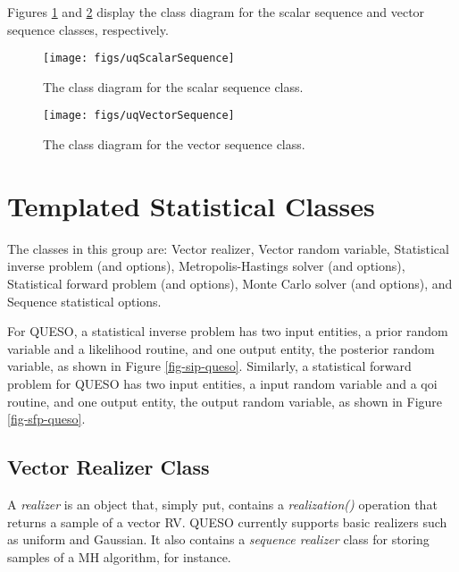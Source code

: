 Figures \ref{fig-scalar-sequence-class} and \ref{fig-vector-sequence-class} display the class diagram for the scalar sequence  and vector sequence classes, respectively.

\begin{figure}[h!]
\centering
\texttt{[image: figs/uqScalarSequence]}
\vspace{-8pt}
\caption{The class diagram for the scalar sequence class.}
\label{fig-scalar-sequence-class}
\end{figure}

\begin{figure}[h!]
\centering
\texttt{[image: figs/uqVectorSequence]}
\vspace{-8pt}
\caption{The class diagram for the vector sequence class.}
\label{fig-vector-sequence-class}
\end{figure}



\section{Templated Statistical Classes}

The classes in this group are: Vector realizer, Vector random variable, Statistical inverse problem (and options), Metropolis-Hastings solver (and options), Statistical forward problem (and options), Monte Carlo solver (and options), and Sequence statistical options.

For QUESO, a statistical inverse problem has two input entities, a prior random variable and
a likelihood routine, and one output entity, the posterior random variable, as shown in Figure \ref{fig-sip-queso}.
%
Similarly, a statistical forward problem for QUESO has two input entities, a input random variable and
a qoi routine, and one output entity, the output random variable, as shown in Figure \ref{fig-sfp-queso}.


\subsection{Vector Realizer Class}
%
A {\it realizer} is an object that, simply put, contains a {\it realization()} operation that returns a sample of a vector RV.
QUESO currently supports basic realizers such as uniform and Gaussian.
It also contains a {\it sequence realizer} class for storing samples of a MH algorithm, for instance.




